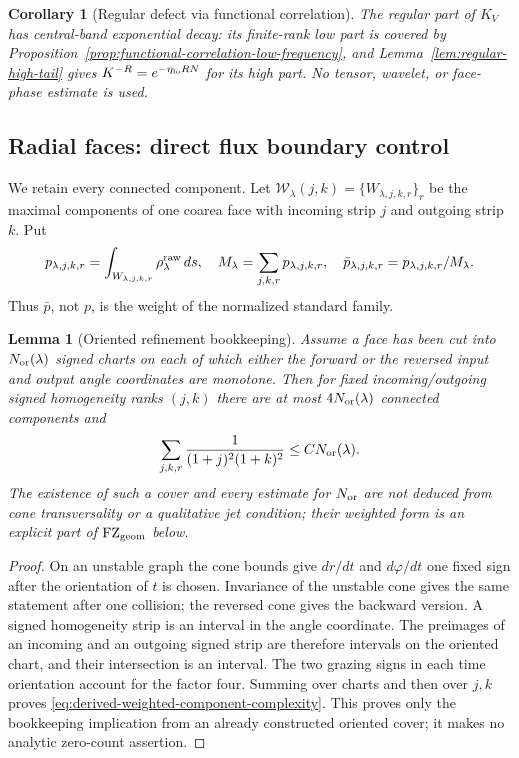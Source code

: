 \documentclass[11pt]{article}
\newtheorem{lemma}[theorem]{Lemma}
\newtheorem{corollary}[theorem]{Corollary}
\begin{document}
\begin{corollary}[Regular defect via functional correlation]
\label{cor:regular-functional-correlation}
The regular part of $K_V$ has central-band exponential decay: its finite-rank
low part is covered by Proposition~\ref{prop:functional-correlation-low-frequency}, and
Lemma~\ref{lem:regular-high-tail} gives
$K^{-R}=e^{-\eta_{\rm lo}RN}$ for its high
part.  No tensor, wavelet, or face-phase estimate is used.
\end{corollary}

\subsection{Radial faces: direct flux boundary control}

We retain every connected component.  Let
$\mathcal W_\lambda(j,k)=\{W_{\lambda,j,k,r}\}_r$ be the maximal components
of one coarea face with incoming strip $j$ and outgoing strip $k$.  Put
\[
 p_{\lambda,j,k,r}=\int_{W_{\lambda,j,k,r}}\rho^{\rm raw}_\lambda\,ds,
 \quad M_\lambda=\sum_{j,k,r}p_{\lambda,j,k,r},\quad
 \bar p_{\lambda,j,k,r}=p_{\lambda,j,k,r}/M_\lambda.
\]
Thus $\bar p$, not $p$, is the weight of the normalized standard family.

\begin{lemma}[Oriented refinement bookkeeping]
\label{lem:cone-monotone-components}
Assume a face has been cut into $N_{\rm or}(\lambda)$ signed charts on each
of which either the forward or the reversed input and output angle
coordinates are monotone.  Then for fixed incoming/outgoing signed
homogeneity ranks $(j,k)$ there are at most $4N_{\rm or}(\lambda)$ connected
components and
\begin{equation}
\label{eq:derived-weighted-component-complexity}
 \sum_{j,k,r}\frac1{(1+j)^2(1+k)^2}
 \le C N_{\rm or}(\lambda).
\end{equation}
The existence of such a cover and every estimate for $N_{\rm or}$ are not
deduced from cone transversality or a qualitative jet condition; their
weighted form is an explicit part of $\mathrm{FZ}_{\rm geom}$ below.
\end{lemma}

\begin{proof}
On an unstable graph the cone bounds give $dr/dt$ and $d\varphi/dt$ one fixed
sign after the orientation of $t$ is chosen.  Invariance of the unstable cone
gives the same statement after one collision; the reversed cone gives the
backward version.  A signed homogeneity strip is an interval in the angle
coordinate.  The preimages of an incoming and an outgoing signed strip are
therefore intervals on the oriented chart, and their intersection is an
interval.  The two grazing signs in each time orientation account for the
factor four.  Summing over charts and then over $j,k$ proves
\eqref{eq:derived-weighted-component-complexity}.  This proves only the
bookkeeping implication from an already constructed oriented cover; it makes
no analytic zero-count assertion.
\end{proof}
\end{document}
